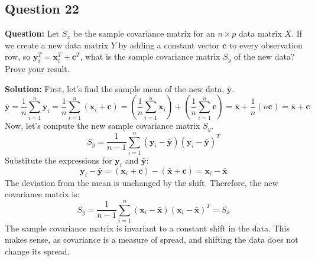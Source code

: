 \subsection*{Question 22}
\textbf{Question:} Let $S_x$ be the sample covariance matrix for an $n \times p$ data matrix $X$. If we create a new data matrix $Y$ by adding a constant vector $\mathbf{c}$ to every observation row, so $\mathbf{y}_i^T = \mathbf{x}_i^T + \mathbf{c}^T$, what is the sample covariance matrix $S_y$ of the new data? Prove your result.

\textbf{Solution:}
First, let's find the sample mean of the new data, $\bar{\mathbf{y}}$.
$$ \bar{\mathbf{y}} = \frac{1}{n} \sum_{i=1}^n \mathbf{y}_i = \frac{1}{n} \sum_{i=1}^n (\mathbf{x}_i + \mathbf{c}) = \left(\frac{1}{n} \sum_{i=1}^n \mathbf{x}_i\right) + \left(\frac{1}{n} \sum_{i=1}^n \mathbf{c}\right) = \bar{\mathbf{x}} + \frac{1}{n}(n\mathbf{c}) = \bar{\mathbf{x}} + \mathbf{c} $$
Now, let's compute the new sample covariance matrix $S_y$.
$$ S_y = \frac{1}{n-1} \sum_{i=1}^n (\mathbf{y}_i - \bar{\mathbf{y}})(\mathbf{y}_i - \bar{\mathbf{y}})^T $$
Substitute the expressions for $\mathbf{y}_i$ and $\bar{\mathbf{y}}$:
$$ \mathbf{y}_i - \bar{\mathbf{y}} = (\mathbf{x}_i + \mathbf{c}) - (\bar{\mathbf{x}} + \mathbf{c}) = \mathbf{x}_i - \bar{\mathbf{x}} $$
The deviation from the mean is unchanged by the shift.
Therefore, the new covariance matrix is:
$$ S_y = \frac{1}{n-1} \sum_{i=1}^n (\mathbf{x}_i - \bar{\mathbf{x}})(\mathbf{x}_i - \bar{\mathbf{x}})^T = S_x $$
The sample covariance matrix is invariant to a constant shift in the data. This makes sense, as covariance is a measure of spread, and shifting the data does not change its spread.
